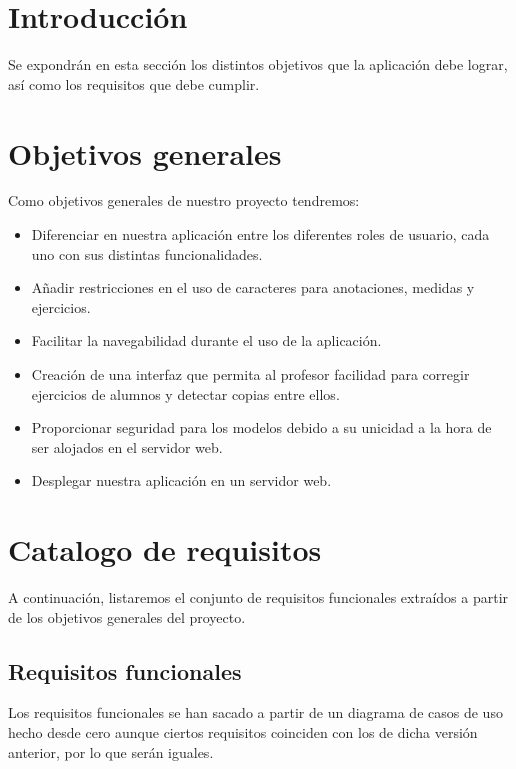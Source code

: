 
\section{Introducción}
Se expondrán en esta sección los distintos objetivos que la aplicación debe lograr, así como los requisitos que debe cumplir.

\section{Objetivos generales}
Como objetivos generales de nuestro proyecto tendremos:
\begin{itemize}
	\item Diferenciar en nuestra aplicación entre los diferentes roles de usuario, cada uno con sus distintas funcionalidades.
	\item Añadir restricciones en el uso de caracteres para anotaciones, medidas y ejercicios.
	\item Facilitar la navegabilidad durante el uso de la aplicación.
	\item Creación de una interfaz que permita al profesor facilidad para corregir ejercicios de alumnos y detectar copias entre ellos.
	\item Proporcionar seguridad para los modelos debido a su unicidad a la hora de ser alojados en el servidor web.
	\item Desplegar nuestra aplicación en un servidor web.
\end{itemize}

\section{Catalogo de requisitos}
A continuación, listaremos el conjunto de requisitos funcionales extraídos a partir de los objetivos generales del proyecto.

\subsection{Requisitos funcionales}
Los requisitos funcionales se han sacado a partir de un diagrama de casos de uso hecho desde cero aunque ciertos requisitos coinciden con los de dicha versión anterior, por lo que serán iguales.

